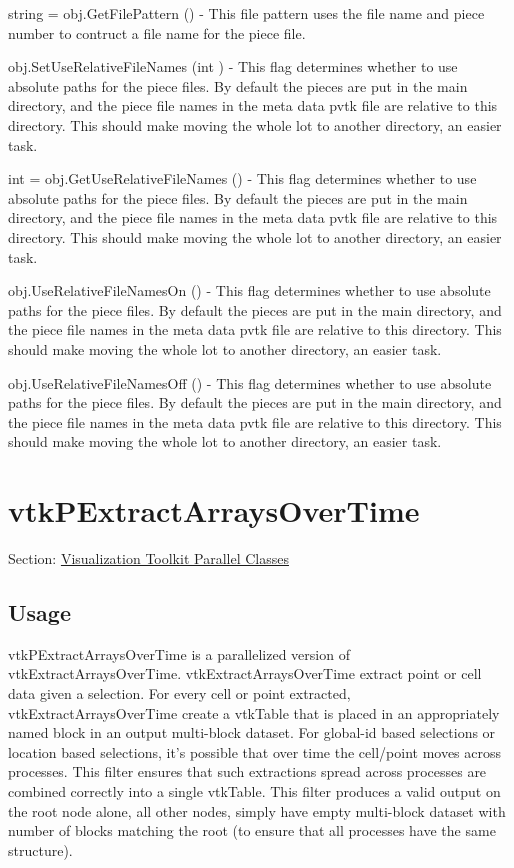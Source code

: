 \begin{DoxyItemize}
\item {\ttfamily string = obj.\-Get\-File\-Pattern ()} -\/ This file pattern uses the file name and piece number to contruct a file name for the piece file.  
\item {\ttfamily obj.\-Set\-Use\-Relative\-File\-Names (int )} -\/ This flag determines whether to use absolute paths for the piece files. By default the pieces are put in the main directory, and the piece file names in the meta data pvtk file are relative to this directory. This should make moving the whole lot to another directory, an easier task.  
\item {\ttfamily int = obj.\-Get\-Use\-Relative\-File\-Names ()} -\/ This flag determines whether to use absolute paths for the piece files. By default the pieces are put in the main directory, and the piece file names in the meta data pvtk file are relative to this directory. This should make moving the whole lot to another directory, an easier task.  
\item {\ttfamily obj.\-Use\-Relative\-File\-Names\-On ()} -\/ This flag determines whether to use absolute paths for the piece files. By default the pieces are put in the main directory, and the piece file names in the meta data pvtk file are relative to this directory. This should make moving the whole lot to another directory, an easier task.  
\item {\ttfamily obj.\-Use\-Relative\-File\-Names\-Off ()} -\/ This flag determines whether to use absolute paths for the piece files. By default the pieces are put in the main directory, and the piece file names in the meta data pvtk file are relative to this directory. This should make moving the whole lot to another directory, an easier task.  
\end{DoxyItemize}\hypertarget{vtkparallel_vtkpextractarraysovertime}{}\section{vtk\-P\-Extract\-Arrays\-Over\-Time}\label{vtkparallel_vtkpextractarraysovertime}
Section\-: \hyperlink{sec_vtkparallel}{Visualization Toolkit Parallel Classes} \hypertarget{vtkwidgets_vtkxyplotwidget_Usage}{}\subsection{Usage}\label{vtkwidgets_vtkxyplotwidget_Usage}
vtk\-P\-Extract\-Arrays\-Over\-Time is a parallelized version of vtk\-Extract\-Arrays\-Over\-Time. vtk\-Extract\-Arrays\-Over\-Time extract point or cell data given a selection. For every cell or point extracted, vtk\-Extract\-Arrays\-Over\-Time create a vtk\-Table that is placed in an appropriately named block in an output multi-\/block dataset. For global-\/id based selections or location based selections, it's possible that over time the cell/point moves across processes. This filter ensures that such extractions spread across processes are combined correctly into a single vtk\-Table. This filter produces a valid output on the root node alone, all other nodes, simply have empty multi-\/block dataset with number of blocks matching the root (to ensure that all processes have the same structure).

